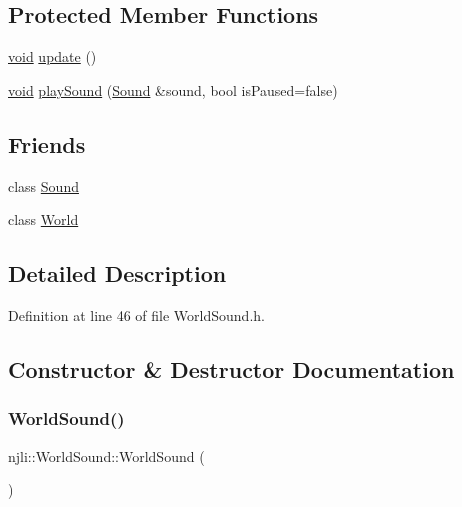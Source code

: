 \subsection*{Protected Member Functions}
\begin{DoxyCompactItemize}
\item 
\mbox{\hyperlink{_thread_8h_af1e856da2e658414cb2456cb6f7ebc66}{void}} \mbox{\hyperlink{classnjli_1_1_world_sound_a30ef05c01a98642bb0b86f77c86a46b8}{update}} ()
\item 
\mbox{\hyperlink{_thread_8h_af1e856da2e658414cb2456cb6f7ebc66}{void}} \mbox{\hyperlink{classnjli_1_1_world_sound_a6d5b69217a2ad24faca15ade9c7b5c63}{play\+Sound}} (\mbox{\hyperlink{classnjli_1_1_sound}{Sound}} \&sound, bool is\+Paused=false)
\end{DoxyCompactItemize}
\subsection*{Friends}
\begin{DoxyCompactItemize}
\item 
class \mbox{\hyperlink{classnjli_1_1_world_sound_a50914f77c7cf4fb97616c898c5291f4b}{Sound}}
\item 
class \mbox{\hyperlink{classnjli_1_1_world_sound_a7b4bcdf992c21ae83363f25df05b1d25}{World}}
\end{DoxyCompactItemize}


\subsection{Detailed Description}


Definition at line 46 of file World\+Sound.\+h.



\subsection{Constructor \& Destructor Documentation}
\mbox{\label{classnjli_1_1_world_sound_aed4012c3031f6f1b8fdf0c3f9ebc37b5}} 
\subsubsection{\texorpdfstring{World\+Sound()}{WorldSound()}}
{\footnotesize\ttfamily njli\+::\+World\+Sound\+::\+World\+Sound (\begin{DoxyParamCaption}{ }\end{DoxyParamCaption})}


